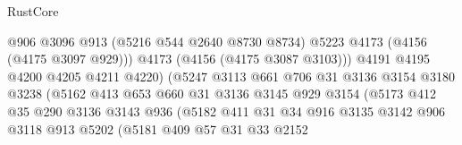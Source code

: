 \begin{lexlean}{RustCore}
\begin{coremodule}
                                        @906
                                        @3096
                                        @913
                                        (@5216 @544 @2640 @8730 @8734)
                                        @5223
                                        @4173
                                        (@4156 (@4175 @3097 @929)))
                                      @4173
                                      (@4156 (@4175 @3087 @3103)))
                                    @4191
                                    @4195
                                    @4200
                                    @4205
                                    @4211
                                    @4220)
                                  (@5247
                                    @3113
                                    @661
                                    @706
                                    @31
                                    @3136
                                    @3154
                                    @3180
                                    @3238
                                    (@5162
                                      @413
                                      @653
                                      @660
                                      @31
                                      @3136
                                      @3145
                                      @929
                                      @3154
                                      (@5173
                                        @412
                                        @35
                                        @290
                                        @3136
                                        @3143
                                        @936
                                        (@5182
                                          @411
                                          @31
                                          @34
                                          @916
                                          @3135
                                          @3142
                                          @906
                                          @3118
                                          @913
                                          @5202
                                          (@5181
                                            @409
                                            @57
                                            @31
                                            @33
                                            @2152

\end{coremodule}
\end{lexlean}
